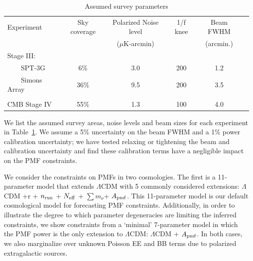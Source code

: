 \documentclass[apj]{emulateapj}
\newcommand{\apmf}{\ensuremath{A_{\rm pmf}}}
\newcommand{\lcdm}{\ensuremath{\Lambda}CDM}
\newcommand{\nrun}{\ensuremath{n_{\rm run}}}
\newcommand{\neff}{\ensuremath{N_{\rm eff}}}
\newcommand{\mnu}{\ensuremath{\sum m_\nu}}
\begin{document}
\begin{table}[tbh]
\begin{center}
\caption{\label{tab:experiments} Assumed survey parameters}
\small
\begin{tabular}{l || c c c c c }
Experiment & Sky coverage & Polarized Noise level  & 1/f knee & Beam FWHM \\
& &($\mu$K-arcmin)&&(arcmin.)\\
\hline
Stage III: & & & & \\

~~~~SPT-3G & 6\% & 3.0 & 200 & 1.2 \\
~~~~Simons Array & 36\% & 9.5 & 200 & 3.5 \\ 
\\
CMB Stage IV & 55\% & 1.3 & 100 & 4.0 \\
\end{tabular}
 \normalsize
\end{center}
\end{table}


We list the assumed survey areas, noise levels and beam sizes for each experiment in Table~\ref{tab:experiments}. 
We  assume a 5\% uncertainty on the beam FWHM and a 1\% power calibration uncertainty; we have tested relaxing or tightening the beam and calibration uncertainty and find these calibration terms have a negligible impact on the PMF constraints. 


We consider the constraints on PMFs in two cosmologies. 
The first is a 11-parameter model that extends \lcdm{} with 5 commonly considered extensions:  \lcdm{}  +r + \nrun{} + \neff{} + \mnu{}+ \apmf. 
This 11-parameter model is our default cosmological model for forecasting PMF constraints. 
Additionally, in order to illustrate the degree to which parameter degeneracies are limiting the inferred constraints,  we show constraints from a `minimal' 7-parameter model in which the PMF power is the only extension to \lcdm{}:  \lcdm{}  + \apmf. 
In both cases, we also marginalize over unknown Poisson EE and BB  terms due to polarized extragalactic sources. 
\end{document}
